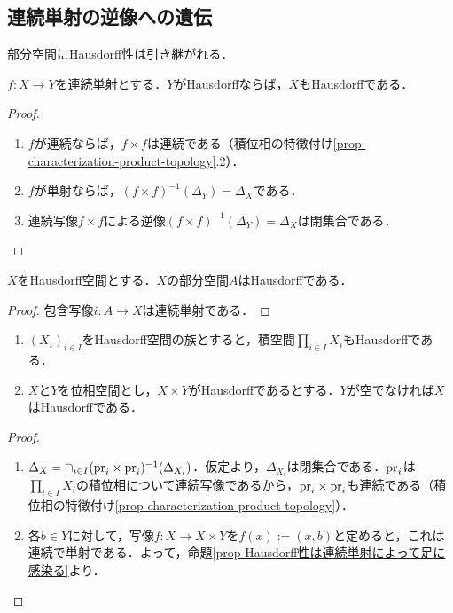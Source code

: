 \documentclass[uplatex,dvipdfmx]{jsreport}
\begin{document}
\subsection{連続単射の逆像への遺伝}

\begin{tcolorbox}[colframe=ForestGreen, colback=ForestGreen!10!white,breakable,colbacktitle=ForestGreen!40!white,coltitle=black,fonttitle=\bfseries\sffamily,
title=]
    部分空間にHausdorff性は引き継がれる．
\end{tcolorbox}

\begin{proposition}\label{prop-Hausdorff性は連続単射によって足に感染る}
    $f:X\to Y$を連続単射とする．$Y$がHausdorffならば，$X$もHausdorffである．
\end{proposition}
\begin{proof}\mbox{}
    \begin{enumerate}
        \item $f$が連続ならば，$f\times f$は連続である（積位相の特徴付け\ref{prop-characterization-product-topology}.2）．
        \item $f$が単射ならば，$(f\times f)^{-1}(\Delta_Y)=\Delta_X$である．
        \item 連続写像$f\times f$による逆像$(f\times f)^{-1}(\Delta_Y)=\Delta_X$は閉集合である．
    \end{enumerate}
\end{proof}

\begin{corollary}\label{cor-subspace-of-Hausdorff-is-Hausdorff}
    $X$をHausdorff空間とする．$X$の部分空間$A$はHausdorffである．
\end{corollary}
\begin{proof}
    包含写像$i:A\to X$は連続単射である．
\end{proof}

\begin{proposition}[直積へのHausdorff性の伝播]\mbox{}
    \begin{enumerate}
        \item $(X_i)_{i\in I}$をHausdorff空間の族とすると，積空間$\prod_{i\in I}X_i$もHausdorffである．
        \item $X$と$Y$を位相空間とし，$X\times Y$がHausdorffであるとする．$Y$が空でなければ$X$はHausdorffである．
    \end{enumerate}
\end{proposition}
\begin{proof}\mbox{}
    \begin{enumerate}
        \item $\Delta_X=\cap_{i\in I}(\mathrm{pr}_i\times\mathrm{pr}_i)^{-1}(\Delta_{X_i})$．仮定より，$\Delta_{X_i}$は閉集合である．$\mathrm{pr}_i$は$\prod_{i\in I}X_i$の積位相について連続写像であるから，$\mathrm{pr}_i\times\mathrm{pr}_i$も連続である（積位相の特徴付け\ref{prop-characterization-product-topology}）．
        \item 各$b\in Y$に対して，写像$f:X\to X\times Y$を$f(x):=(x,b)$と定めると，これは連続で単射である．よって，命題\ref{prop-Hausdorff性は連続単射によって足に感染る}より．
    \end{enumerate}
\end{proof}
\end{document}
